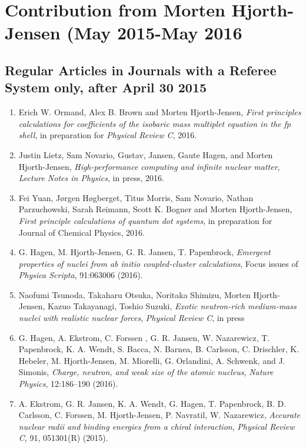 \documentclass[prc,amsart,english,twocolumn,superscriptaddress,showpacs,floatfix]{revtex4}
\begin{document}
 \section*{Contribution from Morten Hjorth-Jensen (May 2015-May 2016}

 \subsection*{Regular Articles in Journals with a Referee System only, after April 30 2015}
\begin{enumerate}
\item Erich W. Ormand, Alex B. Brown and Morten Hjorth-Jensen, \emph{First principles calculations for coefficients of the isobaric mass multiplet equation in the fp shell}, in preparation for \emph{Physical Review C}, 2016. 

\item Justin Lietz, Sam Novario, Gustav, Jansen, Gaute Hagen, and Morten Hjorth-Jensen, \emph{High-performance computing and infinite nuclear matter}, \emph{Lecture Notes in Physics}, in press, 2016.

\item Fei Yuan, Jørgen Høgberget, Titus Morris, Sam Novario, Nathan Parzuchowski, Sarah Reimann, Scott K. Bogner and Morten Hjorth-Jensen,   \emph{First principle calculations of quantum dot systems}, in preparation for Journal of Chemical Physics, 2016.

\item G. Hagen, M. Hjorth-Jensen, G. R. Jansen, T. Papenbrock, \emph{Emergent properties of nuclei from ab initio coupled-cluster calculations}, Focus issues of \emph{Physica Scripta}, 91:063006 (2016).

\item Naofumi Tsunoda, Takaharu Otsuka, Noritaka Shimizu, Morten Hjorth-Jensen, Kazuo Takayanagi, Toshio Suzuki, \emph{Exotic neutron-rich medium-mass nuclei with realistic nuclear forces}, \emph{Physical Review C}, in press

\item G. Hagen, A. Ekstrom, C. Forssen , G. R. Jansen, W. Nazarewicz, T. Papenbrock, K. A. Wendt, S. Bacca, N. Barnea, B. Carlsson, C. Drischler, K. Hebeler, M. Hjorth-Jensen, M. Miorelli, G. Orlandini, A. Schwenk, and J. Simonis,  \emph{Charge, neutron, and weak size of the atomic nucleus},  \emph{Nature Physics}, 12:186–190 (2016).

\item A. Ekstrom, G. R. Jansen, K. A. Wendt, G. Hagen, T. Papenbrock, B. D. Carlsson, C. Forssen, M. Hjorth-Jensen, P. Navratil, W. Nazarewicz,   \emph{Accurate nuclear radii and binding energies from a chiral interaction}, \emph{Physical Review C}, 91, 051301(R) (2015).


\end{enumerate}
\end{document}
